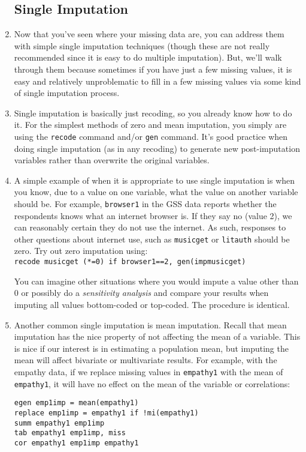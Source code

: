 \documentclass[a4paper,12pt]{article}
\begin{document}
\begin{enumerate}
\subsection*{Single Imputation}

\item Now that you've seen where your missing data are, you can address them with simple single imputation techniques (though these are not really recommended since it is easy to do multiple imputation). But, we'll walk through them because sometimes if you have just a few missing values, it is easy and relatively unproblematic to fill in a few missing values via some kind of single imputation process.

\item Single imputation is basically just recoding, so you already know how to do it. For the simplest methods of zero and mean imputation, you simply are using the \texttt{recode} command and/or \texttt{gen} command. It's good practice when doing single imputation (as in any recoding) to generate new post-imputation variables rather than overwrite the original variables.

\item A simple example of when it is appropriate to use single imputation is when you know, due to a value on one variable, what the value on another variable should be. For example, \texttt{browser1} in the GSS data reports whether the respondents knows what an internet browser is. If they say no (value 2), we can reasonably certain they do not use the internet. As such, responses to other questions about internet use, such as \texttt{musicget} or \texttt{litauth} should be zero. Try out zero imputation using:\\
\texttt{recode musicget (*=0) if browser1==2, gen(impmusicget)}

You can imagine other situations where you would impute a value other than 0 or possibly do a {\em sensitivity analysis} and compare your results when imputing all values bottom-coded or top-coded. The procedure is identical.

\item Another common single imputation is mean imputation. Recall that mean imputation has the nice property of not affecting the mean of a variable. This is nice if our interest is in estimating a population mean, but imputing the mean will affect bivariate or multivariate results. For example, with the empathy data, if we replace missing values in \texttt{empathy1} with the mean of \texttt{empathy1}, it will have no effect on the mean of the variable or correlations:
\begin{verbatim}
egen emp1imp = mean(empathy1)
replace emp1imp = empathy1 if !mi(empathy1)
summ empathy1 emp1imp
tab empathy1 emp1imp, miss
cor empathy1 emp1imp empathy1
\end{verbatim}


\end{enumerate}
\end{document}
